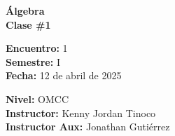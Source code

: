 \begin{center} \textbf
{
    \Large Álgebra \\ \vspace{2mm}Clase \#1
}
\end{center}

\begin{multicols}{2}
{
    \textbf{Encuentro:} 1\\
    \textbf{Semestre:} I\\
    \textbf{Fecha:} 12 de abril de 2025\\
    \begin{flushright}
        \textbf{Nivel:} OMCC\\
        \textbf{Instructor:} Kenny Jordan Tinoco\\
        \textbf{Instructor Aux:} Jonathan Gutiérrez
    \end{flushright}
}
\end{multicols}

\thispagestyle{first-page-style}